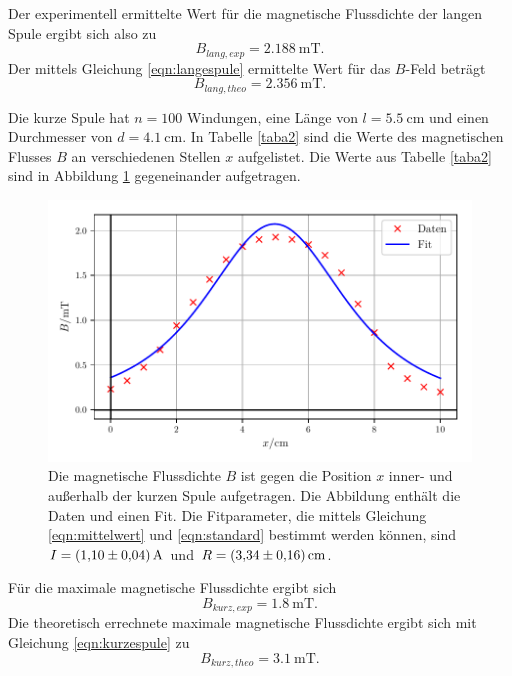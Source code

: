 \noindent Der experimentell ermittelte Wert für die 
magnetische Flussdichte der langen Spule ergibt sich also zu
\begin{equation*}
    B_{lang,exp} = \SI{2.188}{\milli\tesla}.
\end{equation*}
Der mittels Gleichung \eqref{eqn:langespule} ermittelte Wert für
das $B$-Feld beträgt
\begin{equation*}
    B_{lang,theo} = \SI{2.356}{\milli\tesla}.
\end{equation*}

\newpage %
\noindent Die kurze Spule hat $n = \num{100}$ Windungen, eine Länge von
$l = \SI{5.5}{\centi\meter}$ und einen Durchmesser von
$d = \SI{4.1}{\centi\meter}$.
In Tabelle \ref{taba2} sind die Werte des magnetischen Flusses $B$
an verschiedenen Stellen $x$ aufgelistet.
Die Werte aus Tabelle \ref{taba2} sind in Abbildung \ref{plota2}
gegeneinander aufgetragen.


\begin{figure}
    \centering
    \includegraphics{build/plota2.pdf}
    \caption{Die magnetische Flussdichte $B$ ist gegen die Position $x$ inner-
    und außerhalb der kurzen Spule aufgetragen. Die Abbildung enthält die Daten
    und einen Fit. Die Fitparameter, die mittels Gleichung \eqref{eqn:mittelwert} und \eqref{eqn:standard}
    bestimmt werden können, sind $I = \SI{1.10 \pm 0.04}{\ampere}$ und
    $R = \SI{3.34 \pm 0.16}{\centi\meter}$.}
    \label{plota2}
\end{figure}

\noindent Für die maximale magnetische Flussdichte ergibt sich 
\begin{equation*}
   B_{kurz,exp} = \SI{1.8}{\milli\tesla}.
\end{equation*}
Die theoretisch errechnete maximale magnetische Flussdichte
ergibt sich mit Gleichung \eqref{eqn:kurzespule} zu
\begin{equation*}
   B_{kurz,theo} = \SI{3.1}{\milli\tesla}.
\end{equation*}

